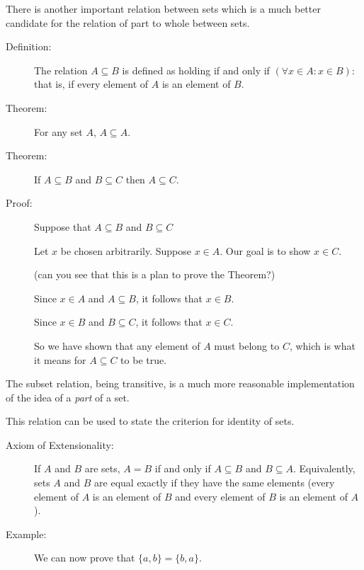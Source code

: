 \documentclass[12pt]{article}
\begin{document}
There is another important relation between sets which is a much better candidate for the relation of part to whole between sets.

\begin{description}

\item[Definition:]  The relation $A \subseteq B$ is defined as holding if and only if $(\forall x \in A: x \in B)$:  that is, if every element of $A$ is an element of $B$.

\item[Theorem:]   For any set $A$, $A \subseteq A$.  

\item[Theorem:]   If $A \subseteq B$ and $B \subseteq C$ then $A \subseteq C$.

\item[Proof:]  Suppose that $A \subseteq B$ and $B \subseteq C$

Let $x$ be chosen arbitrarily.  Suppose $x \in A$.  Our goal is to show $x \in C$.

(can you see that this is a plan to prove the Theorem?)

Since $x \in A$ and $A \subseteq B$, it follows that $x \in B$.

Since $x \in B$ and $B \subseteq C$, it follows that $x \in C$.

So we have shown that any element of $A$ must belong to $C$, which is what it means for $A \subseteq C$ to be true.

\end{description}

The subset relation, being transitive, is a much more reasonable implementation of the idea of a {\em part\/} of a set.

This relation can be used to state the criterion for identity of sets.

\begin{description}

\item[Axiom of Extensionality:]  If $A$ and $B$ are sets, $A = B$ if and only if $A \subseteq B$ and $B\subseteq A$.  Equivalently, sets $A$ and $B$ are equal exactly if they have the same elements (every element of $A$ is an element of $B$ and every element of $B$ is an element of $A$).

\item[Example:]  We can now prove that $\{a,b\} = \{b,a\}$.

\end{description}
\end{document}
